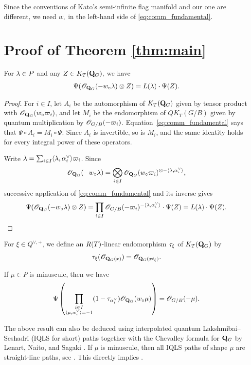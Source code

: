 \documentclass{amsart}
\numberwithin{equation}{section}
\begin{document}
 \begin{remark}
     Since the conventions of Kato's semi-infinite flag manifold and our one are different, we need $w_{\circ}$ in the left-hand side of \eqref{eq:comm_fundamental}. 
 \end{remark}


\section{Proof of Theorem \ref{thm:main}}
\begin{lem}
\label{lem:Phi_sends_O_to_L}
For $\lambda\in P$ and any $Z \in K_T(\mathbf{Q}_G)$, we have
\begin{equation}
\label{eq:Phi_sends_O_to_L}
\Psi(\mathscr{O}_{\mathbf{Q}_G}(-w_\circ\lambda) \otimes Z)
={L}(\lambda) \cdot \Psi(Z).\end{equation}
\end{lem}
\begin{proof}
For $i\in I$, let $A_i$ be the automorphism of $K_T(\mathbf{Q}_G)$ given by
tensor product with $\mathscr{O}_{\mathbf{Q}_G}(w_\circ{\varpi_{i}})$, and let $M_i$ be the
endomorphism of $QK_T(G/B)$ given by quantum multiplication by
$\mathscr{O}_{G/B}(-{\varpi_{i}})$.  Equation~\eqref{eq:comm_fundamental} says that
$\Psi\circ A_i=M_i\circ\Psi$.  Since $A_i$ is invertible, so is $M_i$,
and the same identity holds for every integral power of these
operators.

Write $\lambda=\sum_{i\in I}
\langle\lambda,\alpha_i^\lor\rangle{\varpi_{i}}$.  Since
\[
\mathscr{O}_{\mathbf{Q}_G}(-w_\circ\lambda)
=
\bigotimes_{i\in I}
\mathscr{O}_{\mathbf{Q}_G}(w_\circ{\varpi_{i}})^{\otimes
-\langle\lambda,\alpha_i^\lor\rangle},
\]
successive application of \eqref{eq:comm_fundamental} and its inverse
gives
\[
\Psi(\mathscr{O}_{\mathbf{Q}_G}(-w_\circ\lambda)\otimes Z)
=
\prod_{i\in I}
\mathscr{O}_{G/B}(-{\varpi_{i}})^{-\langle\lambda,\alpha_i^\lor\rangle}
\cdot\Psi(Z)
={L}(\lambda)\cdot\Psi(Z).
\]
\end{proof}

For $\xi\in Q^{\lor,+}$, we define an
$R(T)$-linear endomorphism $\tau_{\xi}$ of $K_T(\mathbf{Q}_G)$ by
\begin{equation}
\tau_{\xi}(\mathscr{O}_{\mathbf{Q}_G(x)})=\mathscr{O}_{\mathbf{Q}_G(xt_{\xi})}.
\end{equation}

\begin{lem} \label{lem:minuscule_correspondence}
If $\mu\in P$ is minuscule, then we have 
\begin{equation}
\Psi\left(
\prod_{\substack{i \in I \\ \langle\mu, \alpha_{i}^{\vee}\rangle = -1}} (1-\tau_{\alpha_i^\lor}) \mathscr{O}_{\mathbf{Q}_G}(w_{\circ}\mu)\right)=
\mathscr{O}_{G/B}(-\mu). 
\end{equation}
\end{lem}
\begin{remark}
The above result can also be deduced using interpolated quantum
Lakshmibai--Seshadri (IQLS for short) paths \cite{KN24} together with the Chevalley formula
for $\mathbf{Q}_G$ by 
Lenart, Naito, and Sagaki \cite[Theorem 33]{LNS-Selecta}.
If $\mu$ is minuscule, then all IQLS paths of shape $\mu$ are straight-line paths, see \cite[Remark~4.4]{KN24}. This directly implies \cite[Corollary~3.5]{NS}. 
\end{remark}
\end{document}
